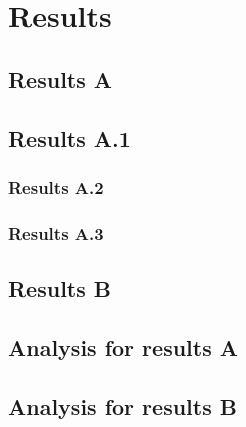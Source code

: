 \newpage
\chapter{Results}
\label{chap:res}

\setcounter{figure}{0}
\setcounter{table}{0}
\setcounter{equation}{0}

\section{Results A}

\section{Results A.1}

\subsection{Results A.2}

\subsection{Results A.3}

\newpage
\section{Results B}

\section{Analysis for results A}

\section{Analysis for results B}
